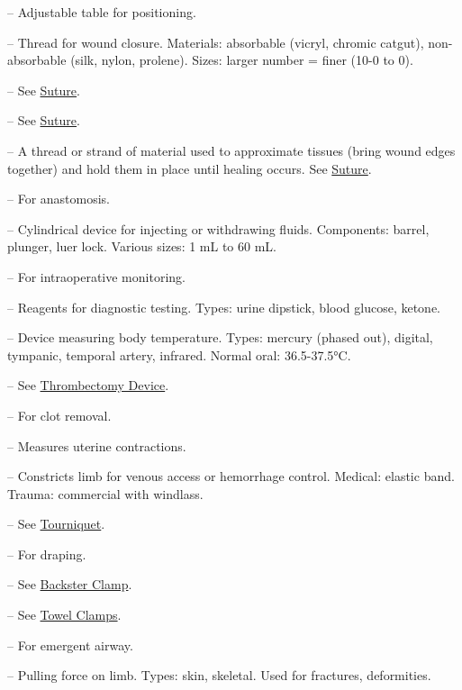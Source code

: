 -- Adjustable table for positioning.

-- Thread for wound closure. Materials: absorbable (vicryl, chromic catgut), non-absorbable (silk, nylon, prolene). Sizes: larger number = finer (10-0 to 0).

-- See \hyperlink{Suture}{Suture}.

-- See \hyperlink{Suture}{Suture}.

-- A thread or strand of material used to approximate tissues (bring wound edges together) and hold them in place until healing occurs. See \hyperlink{Suture}{Suture}.

-- For anastomosis.

-- Cylindrical device for injecting or withdrawing fluids. Components: barrel, plunger, luer lock. Various sizes: 1 mL to 60 mL.

-- For intraoperative monitoring.

-- Reagents for diagnostic testing. Types: urine dipstick, blood glucose, ketone.

-- Device measuring body temperature. Types: mercury (phased out), digital, tympanic, temporal artery, infrared. Normal oral: 36.5-37.5°C.

-- See \hyperlink{Thrombectomy Device}{Thrombectomy Device}.

-- For clot removal.

-- Measures uterine contractions.

-- Constricts limb for venous access or hemorrhage control. Medical: elastic band. Trauma: commercial with windlass.

-- See \hyperlink{Tourniquet}{Tourniquet}.

-- For draping.

-- See \hyperlink{Backster Clamp}{Backster Clamp}.

-- See \hyperlink{Towel Clamps}{Towel Clamps}.

-- For emergent airway.

-- Pulling force on limb. Types: skin, skeletal. Used for fractures, deformities.

